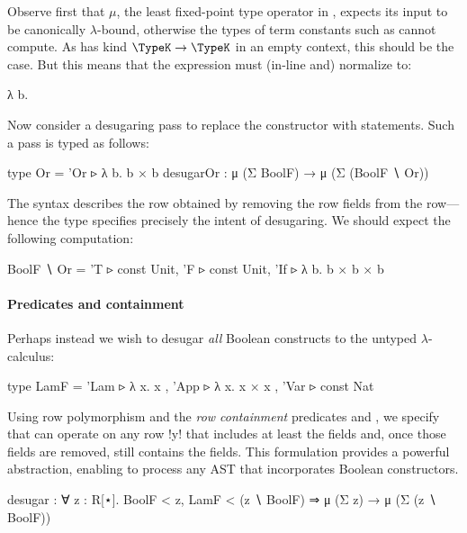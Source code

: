 Observe first that $\mu$, the least fixed-point type operator in \Rome, expects its input to be canonically $\lambda$-bound, otherwise the types of term constants such as  \R{:}    cannot compute. As  has kind $\TypeK \to \TypeK$ in an empty context, this should be the case. But this means that the expression  must (in-line and) normalize to: 

\begin{rosi}
λ b.   
\end{rosi}

Now consider a desugaring pass to replace the  constructor with  statements. Such a pass is typed as follows:

\begin{rosi}
type Or = {'Or ▹ λ b. b × b}
desugarOr : μ (Σ BoolF) → μ (Σ (BoolF ∖ Or))
\end{rosi}

\Ni The syntax  describes the row obtained by removing the  row fields from the  row---hence the type specifies precisely the intent of desugaring. We should expect the following computation:

\begin{rosi}
  BoolF ∖ Or
= {'T  ▹ const Unit, 
   'F  ▹ const Unit, 
   'If ▹ λ b. b × b × b}
\end{rosi}

\paragraph{Predicates and containment}
Perhaps instead we wish to desugar \emph{all} Boolean constructs to the untyped $\lambda$-calculus: 

\begin{rosi}
type LamF  = {'Lam ▹ λ x. x , 
              'App ▹ λ x. x × x , 
              'Var ▹ const Nat}
\end{rosi}

Using row polymorphism and the \emph{row containment} predicates  and , we specify that  can operate on any row !y! that includes at least the  fields and, once those fields are removed, still contains the  fields. This formulation provides a powerful abstraction, enabling  to process any AST that incorporates Boolean constructors.

\begin{rosi}
desugar : ∀ z : R[⋆]. BoolF < z, LamF < (z ∖ BoolF) ⇒
          μ (Σ z) → μ (Σ (z ∖ BoolF))  
\end{rosi}

